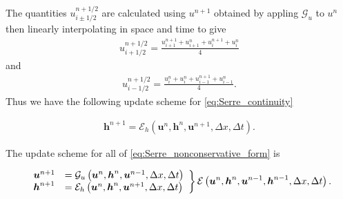 \documentclass[12pt]{article}
\begin{document}
The quantities $u^{n + 1/2}_{i \pm 1/2}$ are calculated using $u^{n+1}$ obtained by appling $\mathcal{G}_u$ to $u^n$ then linearly interpolating in space and time to give
\begin{gather}
u^{n + 1/2}_{i+ 1/2} = \frac{u^{n+1}_{i+1} + u^{n}_{i+1} + u^{n+1}_{i} + u^{n}_{i} }{4}
\end{gather}
and
\begin{gather}
u^{n + 1/2}_{i- 1/2} = \frac{u^{n}_{i} + u^{n}_{i} + u^{n+1}_{i-1}+ u^{n}_{i-1} }{4}.
\end{gather}
Thus we have the following update scheme for \eqref{eq:Serre_continuity}

	\begin{gather}
	\boldsymbol{h}^{n+1} = \mathcal{E}_h\left(\boldsymbol{u}^n,\boldsymbol{h}^n,\boldsymbol{u}^{n+1}, \Delta x, \Delta t \right). 
	\end{gather}

The update scheme for all of \eqref{eq:Serre_nonconservative_form} is

	\begin{gather}
	\left.
	\begin{array}{l l}
	\boldsymbol{u}^{n+1}&=\mathcal{G}_u\left(\boldsymbol{u}^n,\boldsymbol{h}^n, \boldsymbol{u}^{n-1}, \Delta x, \Delta t \right) \\
	\boldsymbol{h}^{n+1}&=\mathcal{E}_h\left(\boldsymbol{u}^n,\boldsymbol{h}^n,\boldsymbol{u}^{n+1}, \Delta x, \Delta t \right)
	\end{array} \right\rbrace \mathcal{E}\left(\boldsymbol{u}^n,\boldsymbol{h}^n, \boldsymbol{u}^{n-1},\boldsymbol{h}^{n-1}, \Delta x, \Delta t \right).
	\end{gather}
\end{document}
